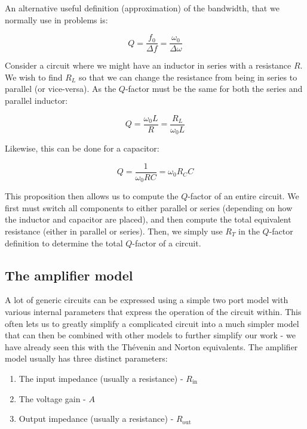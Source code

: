 \documentclass{article}
\begin{document}
\begin{proposition}
    An alternative useful definition (approximation) of the bandwidth, that we normally use in problems is:

    \[ Q = \frac{f_0}{\Delta f} = \frac{\omega_0}{\Delta \omega} \]
\end{proposition}

\begin{proposition}
    Consider a circuit where we might have an inductor in series with a resistance $R$. We wish to find $R_L$ so that we can change the resistance from being in series to parallel (or vice-versa). As the $Q$-factor must be the same for both the series and parallel inductor:

    \[ Q = \frac{\omega_0L}{R} = \frac{R_L}{\omega_0L} \]

    Likewise, this can be done for a capacitor:

    \[ Q = \frac{1}{\omega_0RC} = \omega_0R_CC \]
\end{proposition}

This proposition then allows us to compute the $Q$-factor of an entire circuit. We first must switch all components to either parallel or series (depending on how the inductor and capacitor are placed), and then compute the total equivalent resistance (either in parallel or series). Then, we simply use $R_T$ in the $Q$-factor definition to determine the total $Q$-factor of a circuit.

\newpage

\subsection{The amplifier model}

A lot of generic circuits can be expressed using a simple two port model with various internal parameters that express the operation of the circuit within. This often lets us to greatly simplify a complicated circuit into a much simpler model that can then be combined with other models to further simplify our work - we have already seen this with the Thévenin and Norton equivalents. The amplifier model usually has three distinct parameters:

\begin{enumerate}
    \item The input impedance (usually a resistance) - $R_{\text{in}}$
    \item The voltage gain - $A$
    \item Output impedance (usually a resistance) - $R_{\text{out}}$
\end{enumerate}
\end{document}
